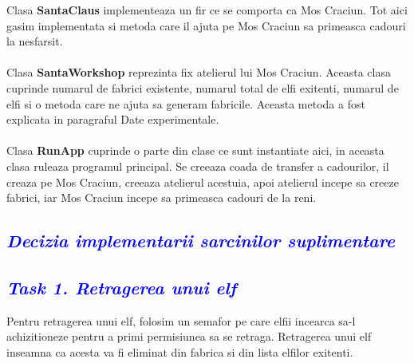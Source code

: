 \documentclass{article}
\begin{document}
Clasa \textbf{SantaClaus} implementeaza un fir ce se comporta ca Mos Craciun. Tot aici gasim implementata si metoda care il ajuta pe Mos Craciun sa primeasca cadouri la nesfarsit.\\\\
Clasa \textbf{SantaWorkshop} reprezinta fix atelierul lui Mos Craciun. Aceasta clasa cuprinde numarul de fabrici existente, numarul total de elfi exitenti, numarul de elfi si o metoda care ne ajuta sa generam fabricile. Aceasta metoda a fost explicata in paragraful Date experimentale.\\\\
Clasa \textbf{RunApp} cuprinde o parte din clase ce sunt instantiate aici, in aceasta clasa  ruleaza programul principal. Se creeaza coada de transfer a cadourilor, il creaza pe Mos Craciun, creeaza atelierul acestuia, apoi atelierul incepe sa creeze fabrici, iar Mos Craciun incepe sa primeasca cadouri de la reni.\newline
\textcolor{blue}{\section{\itshape \textcolor{blue}{Decizia implementarii sarcinilor suplimentare}}}
\textcolor{blue}{\subsection{\itshape\textcolor{blue}{Task 1. Retragerea unui elf}}}
Pentru retragerea unui elf, folosim un semafor pe care elfii incearca sa-l achizitioneze pentru a primi permisiunea sa se retraga. Retragerea unui elf inseamna ca acesta va fi eliminat din fabrica si din lista elfilor exitenti.
\end{document}
